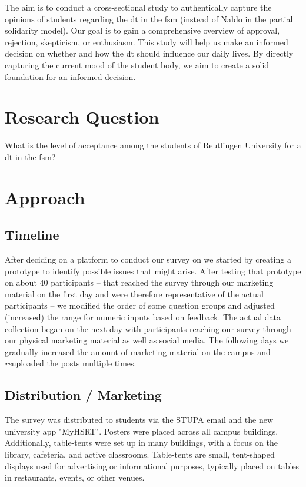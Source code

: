 The aim is to conduct a cross-sectional study to authentically capture the opinions of students regarding the \gls{dt} in the \gls{fsm} (instead of Naldo in the partial solidarity model). Our goal is to gain a comprehensive overview of approval, rejection, skepticism, or enthusiasm. This study will help us make an informed decision on whether and how the \gls{dt} should influence our daily lives. By directly capturing the current mood of the student body, we aim to create a solid foundation for an informed decision.

\section{Research Question}

What is the level of acceptance among the students of Reutlingen University for a \gls{dt} in the \gls{fsm}?

\section{Approach}
\subsection{Timeline}
After deciding on a platform to conduct our survey on we started by creating a prototype to identify possible issues that might arise. After testing that prototype on about 40 participants -- that reached the survey through our marketing material on the first day and were therefore representative of the actual participants -- we modified the order of some question groups and adjusted (increased) the range for numeric inputs based on feedback. The actual data collection began on the next day with participants reaching our survey through our physical marketing material as well as social media. The following days we gradually increased the amount of marketing material on the campus and \textit{re}uploaded the posts multiple times.

\subsection{Distribution / Marketing}

The survey was distributed to students via the STUPA email and the new university app "MyHSRT". Posters were placed across all campus buildings. Additionally, table-tents were set up in many buildings, with a focus on the library, cafeteria, and active classrooms. Table-tents are small, tent-shaped displays used for advertising or informational purposes, typically placed on tables in restaurants, events, or other venues.

